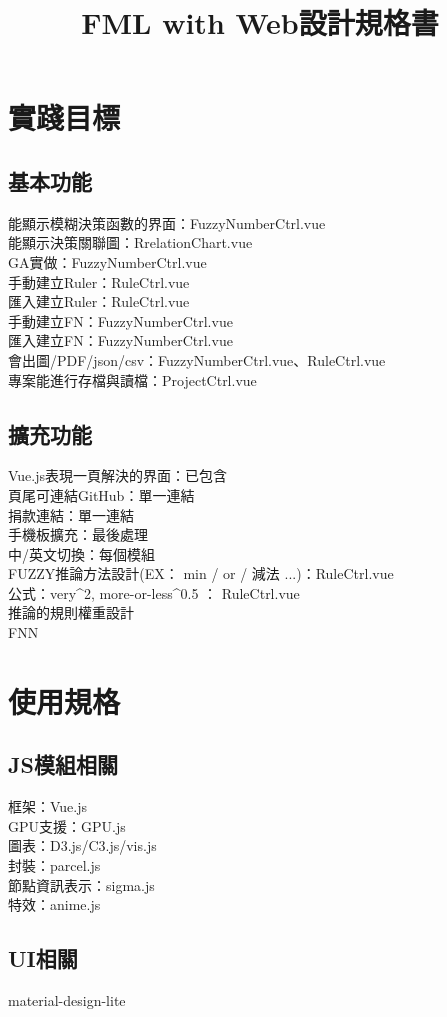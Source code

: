 \documentclass[UTF8]{article}
\title{FML with Web設計規格書}
\begin{document}
	
  \section{實踐目標}
		\subsection{基本功能}
			能顯示模糊決策函數的界面：FuzzyNumberCtrl.vue \\
			能顯示決策關聯圖：RrelationChart.vue \\
			GA實做：FuzzyNumberCtrl.vue \\
			手動建立Ruler：RuleCtrl.vue \\
			匯入建立Ruler：RuleCtrl.vue \\
			手動建立FN：FuzzyNumberCtrl.vue \\
			匯入建立FN：FuzzyNumberCtrl.vue \\
			會出圖/PDF/json/csv：FuzzyNumberCtrl.vue、RuleCtrl.vue \\
			專案能進行存檔與讀檔：ProjectCtrl.vue \\

		\subsection{擴充功能}
			Vue.js表現一頁解決的界面：已包含 \\
			頁尾可連結GitHub：單一連結 \\
			捐款連結：單一連結 \\
			手機板擴充：最後處理 \\
			中/英文切換：每個模組 \\
			FUZZY推論方法設計(EX： min / or / 減法 ...)：RuleCtrl.vue \\
			公式：very^2, more-or-less^{0.5} ： RuleCtrl.vue \\
			推論的規則權重設計 \\
			FNN \\

  \section{使用規格}
		\subsection{JS模組相關}
		框架：Vue.js \\
		GPU支援：GPU.js \\
		圖表：D3.js/C3.js/vis.js \\
		封裝：parcel.js \\
		節點資訊表示：sigma.js \\
		特效：anime.js

		\subsection{UI相關}
		material-design-lite \\
\end{document}
